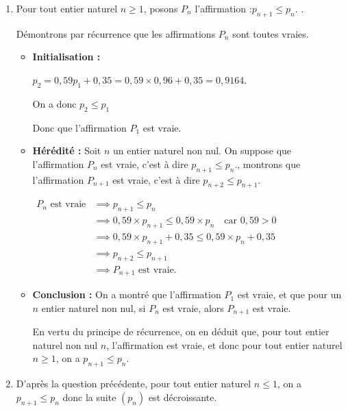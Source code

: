 \begin{enumerate}
	\item Pour tout entier naturel  $n \geqslant 1$, posons $P_n$ l'affirmation :\quad \og $p_{n+1} \leqslant p_{n}$. \fg{}.
	
	Démontrons par récurrence que les affirmations $P_n$ sont toutes vraies.
	
	\begin{itemize}[label={\textbullet~}]
		\item \textbf{Initialisation :} 
		
		$p_2= 0,59 p_{1}+0,35 = 0,59 \times 0,96 + 0,35 = 0,9164$. 
		
		On a donc $p_2 \leqslant p_1$
		
		Donc que l'affirmation $P_1$ est vraie.
		
		\item \textbf{Hérédité :} Soit $n$ un entier naturel non nul. On suppose que l'affirmation $P_n$ est vraie, c'est à dire $p_{n+1} \leqslant p_n  $\fg{}., montrons que l'affirmation $P_{n+1}$ est vraie, c'est à dire $p_{n+2} \leqslant p_{n+1}$\fg{}.
		
		$\begin{aligned}
			P_n \text{ est vraie}
			&\implies p_{n+1} \leqslant p_n \\
			&\implies  0,59 \times p_{n+1} \leqslant 0,59 \times  p_n \quad \text{car } 0,59>0 \\
			&\implies  0,59 \times p_{n+1} + 0,35  \leqslant 0,59 \times  p_n + 0,35  \\
			&\implies p_{n+2} \leqslant p_{n+1}  \\
			&\implies P_{n+1}\text{ est vraie.}
		\end{aligned}$
		
		\item \textbf{Conclusion :} On a montré que l'affirmation $P_1$ est vraie, et que pour un $n$ entier naturel non nul, si $P_n$ est vraie, alors $P_{n+1}$ est vraie.
		
		En vertu du principe de récurrence, on en déduit que, pour tout entier naturel non nul $n$, l'affirmation est vraie, et donc pour tout entier naturel $n \geqslant 1 $, on a $p_{n+1} \leqslant p_{n}$.
		
	\end{itemize}
	
	
	
	
	\item D'après la question précédente, pour tout entier naturel $n \leqslant 1 $, on a $p_{n+1} \leqslant p_{n}$ donc la suite $(p_{n})$ est décroissante. 
	

\end{enumerate}
